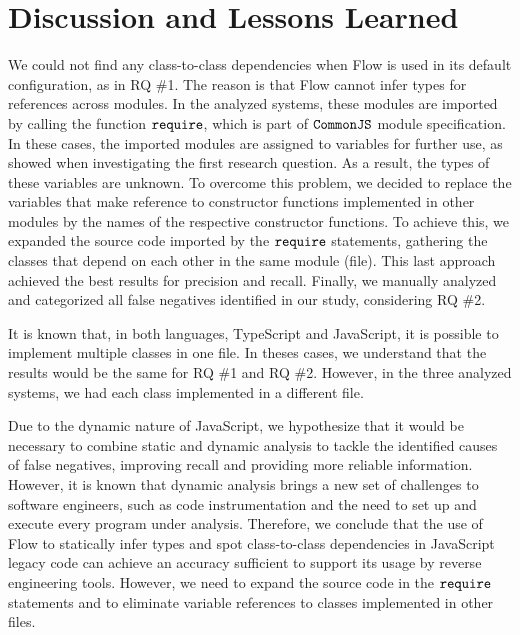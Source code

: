 \documentclass[review]{elsarticle}
\newcommand{\mcode}[1]{$\tt #1$}
\begin{document}
\section {Discussion and Lessons Learned}
\label{sec:discussion}

We could not find any class-to-class dependencies when Flow is used in its default configuration, as in RQ \#1. The reason is that Flow cannot infer types for references across modules. In the analyzed systems, these modules are imported by calling the function \mcode{require}, which is part of \mcode{CommonJS} module specification. In these cases, the imported modules are assigned to variables for further use, as showed when investigating the first research question. As a result, the types of these variables are unknown. To overcome this problem, we decided to replace the variables that make reference to constructor functions implemented in other modules by the names of the respective constructor functions. To achieve this, we expanded the source code imported by the \mcode{require} statements, gathering the classes that depend on each other in the same module (file). This last approach achieved the best results for precision and recall. Finally, we manually analyzed and categorized all false negatives identified in our study, considering RQ \#2. 

It is known that, in both languages, TypeScript and JavaScript, it is possible to implement multiple classes in one file. In theses cases, we understand that the results would be the same for RQ \#1 and RQ \#2. However, in the three analyzed systems, we had each class implemented in a different file.

Due to the dynamic nature of JavaScript, we hypothesize that it would be necessary to combine static and dynamic analysis to tackle the identified causes of false negatives, improving recall and providing more reliable information. However, it is known that dynamic analysis brings a new set of challenges to software engineers, such as code instrumentation and the need to set up and execute every program under analysis. Therefore, we conclude that the use of Flow to statically infer types and spot class-to-class dependencies in JavaScript legacy code can achieve an accuracy sufficient to support its usage by reverse engineering tools. However, we need to expand the source code in the \mcode{require} statements and to eliminate variable references to classes implemented in other files.



\end{document}
